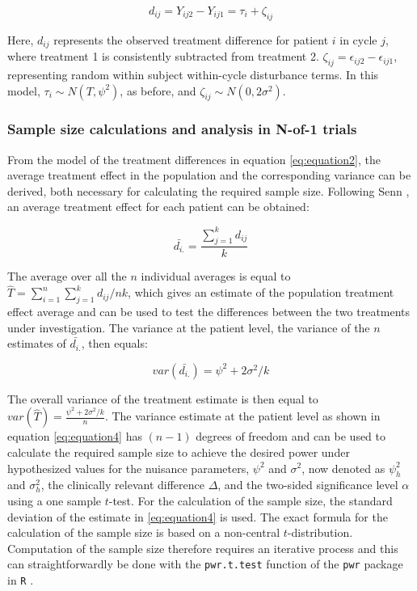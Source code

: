 \documentclass[AMA,STIX1COL,]{WileyNJD-v2}
\begin{document}
\begin{equation} \label{eq:equation2}
d_{ij} = Y_{ij2} - Y_{ij1} = \tau_i + \zeta_{ij}
\end{equation}

Here, \(d_{ij}\) represents the observed treatment difference for patient \(i\) in cycle \(j\), where treatment 1 is consistently subtracted from treatment 2. \(\zeta_{ij} = \epsilon_{ij2} - \epsilon_{ij1}\), representing random within subject within-cycle disturbance terms. In this model, \(\tau_i \sim N(T, \psi^2)\), as before, and \(\zeta_{ij} \sim N(0, 2\sigma^2)\).

\hypertarget{sampcalc}{%
\subsubsection{Sample size calculations and analysis in N-of-1 trials}\label{sampcalc}}

From the model of the treatment differences in equation \eqref{eq:equation2}, the average treatment effect in the population and the corresponding variance can be derived, both necessary for calculating the required sample size. Following Senn \citep{senn2019}, an average treatment effect for each patient can be obtained:

\begin{equation} \label{eq:equation3}
\bar{d_{i.}} = \frac{\sum_{j=1}^{k} d_{ij}}{k}
\end{equation}

The average over all the \(n\) individual averages is equal to \(\hat{T} = \sum_{i=1}^{n} \sum_{j=1}^{k} d_{ij}/ nk\), which gives an estimate of the population treatment effect average and can be used to test the differences between the two treatments under investigation. The variance at the patient level, the variance of the \(n\) estimates of \(\bar{d_{i.}}\), then equals:

\begin{equation} \label{eq:equation4}
var(\bar{d_{i.}}) = \psi^2 + 2\sigma^2 /k
\end{equation}

The overall variance of the treatment estimate is then equal to \(var(\hat{T}) = \frac{\psi^2 + 2\sigma^2 / k}{n}\). The variance estimate at the patient level as shown in equation \eqref{eq:equation4} has \((n-1)\) degrees of freedom \citep{senn2019} and can be used to calculate the required sample size to achieve the desired power under hypothesized values for the nuisance parameters, \(\psi^2\) and \(\sigma^2\), now denoted as \(\psi^2_h\) and \(\sigma^2_h\), the clinically relevant difference \(\Delta\), and the two-sided significance level \(\alpha\) using a one sample \(t\)-test. For the calculation of the sample size, the standard deviation of the estimate in \eqref{eq:equation4} is used. The exact formula for the calculation of the sample size is based on a non-central \(t\)-distribution. Computation of the sample size therefore requires an iterative process and this can straightforwardly be done with the \texttt{pwr.t.test} function of the \texttt{pwr} package \citep{champely2018} in \texttt{R} \citep{Rmanual}.
\end{document}
